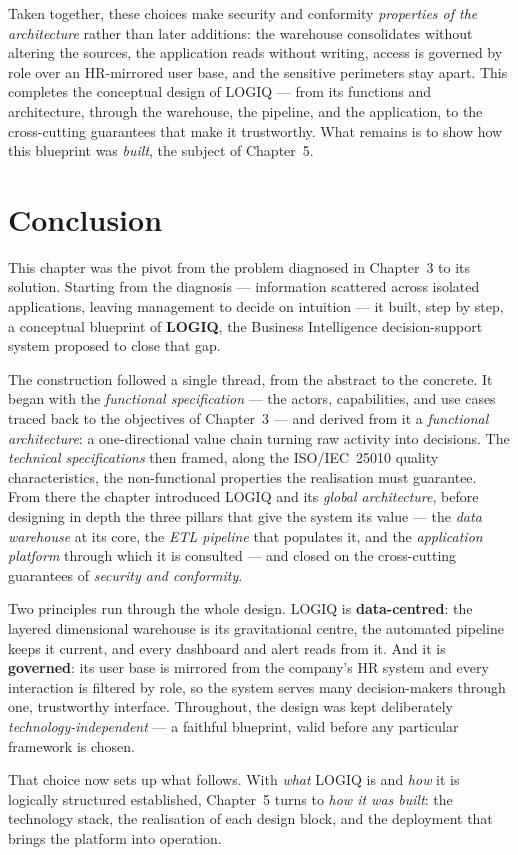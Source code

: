 Taken together, these choices make security and conformity \emph{properties of the architecture} rather
than later additions: the warehouse consolidates without altering the sources, the application reads
without writing, access is governed by role over an HR-mirrored user base, and the sensitive perimeters
stay apart. This completes the conceptual design of LOGIQ --- from its functions and architecture, through
the warehouse, the pipeline, and the application, to the cross-cutting guarantees that make it
trustworthy. What remains is to show how this blueprint was \emph{built}, the subject of Chapter~5.

\section*{Conclusion}

This chapter was the pivot from the problem diagnosed in Chapter~3 to its solution. Starting from the
diagnosis --- information scattered across isolated applications, leaving management to decide on
intuition --- it built, step by step, a conceptual blueprint of \textbf{LOGIQ}, the Business
Intelligence decision-support system proposed to close that gap.

The construction followed a single thread, from the abstract to the concrete. It began with the
\emph{functional specification} --- the actors, capabilities, and use cases traced back to the
objectives of Chapter~3 --- and derived from it a \emph{functional architecture}: a one-directional
value chain turning raw activity into decisions. The \emph{technical specifications} then framed, along
the ISO/IEC~25010 quality characteristics, the non-functional properties the realisation must guarantee.
From there the chapter introduced LOGIQ and its \emph{global architecture}, before designing in depth
the three pillars that give the system its value --- the \emph{data warehouse} at its core, the
\emph{ETL pipeline} that populates it, and the \emph{application platform} through which it is consulted
--- and closed on the cross-cutting guarantees of \emph{security and conformity}.

Two principles run through the whole design. LOGIQ is \textbf{data-centred}: the layered dimensional
warehouse is its gravitational centre, the automated pipeline keeps it current, and every dashboard and
alert reads from it. And it is \textbf{governed}: its user base is mirrored from the company's HR system
and every interaction is filtered by role, so the system serves many decision-makers through one,
trustworthy interface. Throughout, the design was kept deliberately \emph{technology-independent} --- a
faithful blueprint, valid before any particular framework is chosen.

That choice now sets up what follows. With \emph{what} LOGIQ is and \emph{how} it is logically
structured established, Chapter~5 turns to \emph{how it was built}: the technology stack, the realisation
of each design block, and the deployment that brings the platform into operation.
